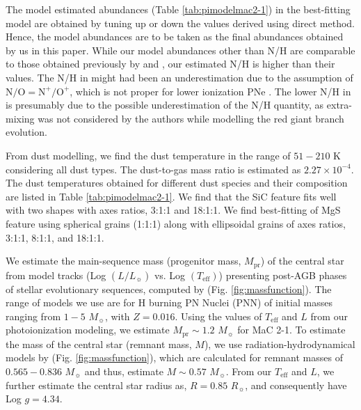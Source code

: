 \documentclass[a4paper,fleqn,usenatbib]{mnras}
\begin{document}
The model estimated abundances (Table \ref{tab:pimodelmac2-1}) in the best-fitting model are obtained by tuning up or down the values derived using direct method. Hence, the model abundances are to be taken as the final abundances obtained by us in this paper. While our model abundances other than N/H are comparable to those obtained previously by \citet{1996A&A...307..215C} and \citet{2017MNRAS.471.4648V}, our estimated N/H is higher than their values. The N/H in \citet{1996A&A...307..215C} might had been an underestimation due to the assumption of $\mathrm{N/O}=\mathrm{N^+/O^+}$, which is not proper for lower ionization PNe \citep{2014MNRAS.440..536D}. The lower N/H in \citet{2017MNRAS.471.4648V} is presumably due to the possible underestimation of the N/H quantity, as extra-mixing was not considered by the authors while modelling the red giant branch evolution.

From dust modelling, we find the dust temperature in the range of $51-210$ K considering all dust types. The dust-to-gas mass ratio is estimated as $2.27\times10^{-4}$. The dust temperatures obtained for different dust species and their composition are listed in Table \ref{tab:pimodelmac2-1}. We find that the SiC feature fits well with two shapes with axes ratios, 3:1:1 and 18:1:1. We find best-fitting of MgS feature using spherical grains (1:1:1) along with ellipsoidal grains of axes ratios, 3:1:1, 8:1:1, and 18:1:1.

We estimate the main-sequence mass (progenitor mass, $M_\mathrm{pr}$) of the central star from model tracks (Log $(L/L_{\sun})$ vs. Log $(T_\mathrm{eff})$) presenting post-AGB phases of stellar evolutionary sequences, computed by \citet{1994ApJS...92..125V} (Fig. \ref{fig:massfunction}). The range of models we use are for H burning PN Nuclei (PNN) of initial masses ranging from $1-5$ $M_{\sun}$, with $Z=0.016$. Using the values of $T_\mathrm{eff}$ and $L$ from our photoionization modeling, we estimate $M_\mathrm{pr}\sim1.2$ $M_{\sun}$ for MaC 2-1. To estimate the mass of the central star (remnant mass, $M$), we use radiation-hydrodynamical models by \citet{2013A&A...558A..78J} (Fig. \ref{fig:massfunction}), which are calculated for remnant masses of $0.565-0.836$ $M_{\sun}$ and thus, estimate $M\sim0.57$ $M_{\sun}$. From our $T_\mathrm{eff}$ and $L$, we further estimate the central star radius as, $R=0.85$ $R_{\sun}$, and consequently have Log $g=4.34$.
\end{document}
